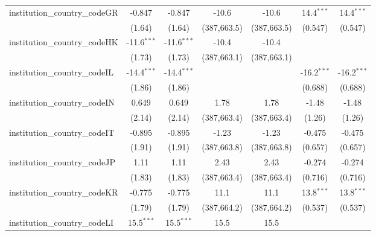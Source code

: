 \begin{tabular}{lcccccc}
   institution\_country\_codeGR          & -0.847        & -0.847        & -10.6         & -10.6         & 14.4$^{***}$  & 14.4$^{***}$\\   
                                         & (1.64)        & (1.64)        & (387,663.5)   & (387,663.5)   & (0.547)       & (0.547)\\   
   institution\_country\_codeHK          & -11.6$^{***}$ & -11.6$^{***}$ & -10.4         & -10.4         &               &   \\   
                                         & (1.73)        & (1.73)        & (387,663.1)   & (387,663.1)   &               &   \\   
   institution\_country\_codeIL          & -14.4$^{***}$ & -14.4$^{***}$ &               &               & -16.2$^{***}$ & -16.2$^{***}$\\   
                                         & (1.86)        & (1.86)        &               &               & (0.688)       & (0.688)\\   
   institution\_country\_codeIN          & 0.649         & 0.649         & 1.78          & 1.78          & -1.48         & -1.48\\   
                                         & (2.14)        & (2.14)        & (387,663.4)   & (387,663.4)   & (1.26)        & (1.26)\\   
   institution\_country\_codeIT          & -0.895        & -0.895        & -1.23         & -1.23         & -0.475        & -0.475\\   
                                         & (1.91)        & (1.91)        & (387,663.8)   & (387,663.8)   & (0.657)       & (0.657)\\   
   institution\_country\_codeJP          & 1.11          & 1.11          & 2.43          & 2.43          & -0.274        & -0.274\\   
                                         & (1.83)        & (1.83)        & (387,663.4)   & (387,663.4)   & (0.716)       & (0.716)\\   
   institution\_country\_codeKR          & -0.775        & -0.775        & 11.1          & 11.1          & 13.8$^{***}$  & 13.8$^{***}$\\   
                                         & (1.79)        & (1.79)        & (387,664.2)   & (387,664.2)   & (0.537)       & (0.537)\\   
   institution\_country\_codeLI          & 15.5$^{***}$  & 15.5$^{***}$  & 15.5          & 15.5          &               &   \\   

\end{tabular}
